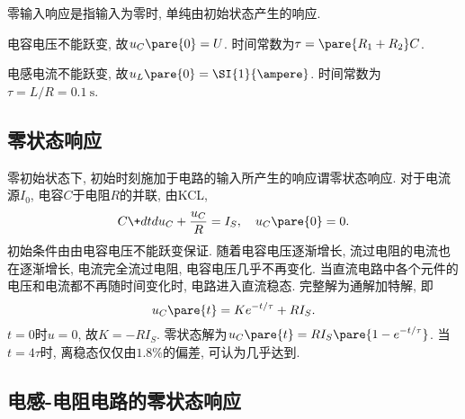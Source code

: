 \documentclass{ctexart}
\begin{document}
\begin{remark}
    零输入响应是指输入为零时, 单纯由初始状态产生的响应.
\end{remark}
\begin{sample}
    \begin{ex}
    \end{ex}
    \begin{solution}
        电容电压不能跃变, 故$u_C\pare{0} = U$. 时间常数为$\tau = \pare{R_1+R_2}C$.
    \end{solution}
\end{sample}
\begin{sample}
    \begin{ex}
    \end{ex}
    \begin{solution}
        电感电流不能跃变, 故$u_L\pare{0} = \SI{1}{\ampere}$. 时间常数为$\tau = L/R = \SI{0.1}{\second}$.
    \end{solution}
\end{sample}


\subsection{零状态响应} %
\label{sub:零状态响应}

零初始状态下, 初始时刻施加于电路的输入所产生的响应谓零状态响应. 对于电流源$I_0$, 电容$C$于电阻$R$的并联, 由KCL,
\[ C \+dtd{u_C} + \frac{u_C}{R} = I_S,\quad u_C\pare{0} = 0. \]
初始条件由由电容电压不能跃变保证. 随着电容电压逐渐增长, 流过电阻的电流也在逐渐增长, 电流完全流过电阻, 电容电压几乎不再变化. 当直流电路中各个元件的电压和电流都不再随时间变化时, 电路进入直流稳态. 完整解为通解加特解, 即
\[ u_C\pare{t} = Ke^{-t/\tau} + RI_S. \]
$t=0$时$u=0$, 故$K=-RI_S$. 零状态解为$u_C\pare{t} = \displaystyle RI_S\pare{1-e^{-t/\tau}}$. 当$t=4\tau$时, 离稳态仅仅由$1.8\%$的偏差, 可认为几乎达到.


\subsection{电感-电阻电路的零状态响应} %
\label{sub:电感_电阻电路的零状态响应}
\end{document}
